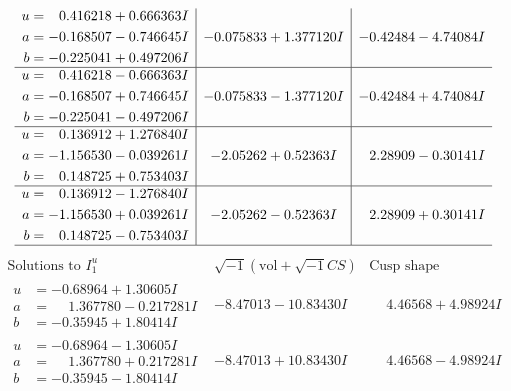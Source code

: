 \documentclass[1p]{elsarticle_modified}
\theoremstyle{definition}
\newcommand{\I}{\sqrt{-1}}
\begin{document}
$$\begin{array}{c|c|c}
\begin{aligned}
u &= \phantom{-}0.416218 + 0.666363 I \\
a &= -0.168507 - 0.746645 I \\
b &= -0.225041 + 0.497206 I\end{aligned}
 & -0.075833 + 1.377120 I & -0.42484 - 4.74084 I \\ \hline\begin{aligned}
u &= \phantom{-}0.416218 - 0.666363 I \\
a &= -0.168507 + 0.746645 I \\
b &= -0.225041 - 0.497206 I\end{aligned}
 & -0.075833 - 1.377120 I & -0.42484 + 4.74084 I \\ \hline\begin{aligned}
u &= \phantom{-}0.136912 + 1.276840 I \\
a &= -1.156530 - 0.039261 I \\
b &= \phantom{-}0.148725 + 0.753403 I\end{aligned}
 & -2.05262 + 0.52363 I & \phantom{-}2.28909 - 0.30141 I \\ \hline\begin{aligned}
u &= \phantom{-}0.136912 - 1.276840 I \\
a &= -1.156530 + 0.039261 I \\
b &= \phantom{-}0.148725 - 0.753403 I\end{aligned}
 & -2.05262 - 0.52363 I & \phantom{-}2.28909 + 0.30141 I\\
 \hline 
 \end{array}$$\newpage$$\begin{array}{c|c|c}  
\text{Solutions to }I^u_{1}& \I (\text{vol} + \sqrt{-1}CS) & \text{Cusp shape}\\
 \hline 
\begin{aligned}
u &= -0.68964 + 1.30605 I \\
a &= \phantom{-}1.367780 - 0.217281 I \\
b &= -0.35945 + 1.80414 I\end{aligned}
 & -8.47013 - 10.83430 I & \phantom{-}4.46568 + 4.98924 I \\ \hline\begin{aligned}
u &= -0.68964 - 1.30605 I \\
a &= \phantom{-}1.367780 + 0.217281 I \\
b &= -0.35945 - 1.80414 I\end{aligned}
 & -8.47013 + 10.83430 I & \phantom{-}4.46568 - 4.98924 I \\ \hline\begin{aligned}

\end{aligned}
\end{array}$$
\end{document}
